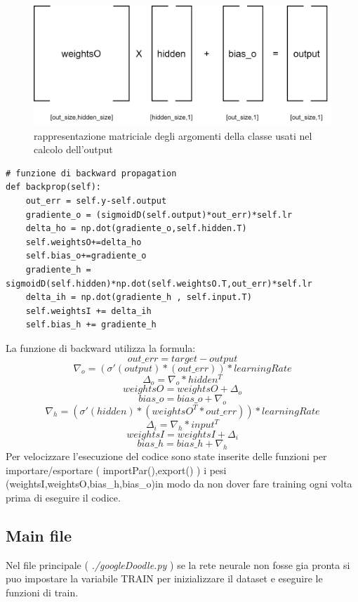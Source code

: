 \documentclass[12pt]{article}
\begin{document}
\begin{figure}[h!]
	\centering
	\includegraphics[width=10 cm]{resources/output.png}
	\caption{rappresentazione matriciale degli argomenti della classe usati nel calcolo dell'output}
	\label{fig:output}
\end{figure}
\newpage
\begin{lstlisting}[language=myPython]
# funzione di backward propagation
def backprop(self):
	out_err = self.y-self.output
	gradiente_o = (sigmoidD(self.output)*out_err)*self.lr
	delta_ho = np.dot(gradiente_o,self.hidden.T)
	self.weightsO+=delta_ho
	self.bias_o+=gradiente_o
	gradiente_h = sigmoidD(self.hidden)*np.dot(self.weightsO.T,out_err)*self.lr
	delta_ih = np.dot(gradiente_h , self.input.T)
	self.weightsI += delta_ih
	self.bias_h += gradiente_h
\end{lstlisting}
La funzione di backward utilizza la formula:
\[out\_err=target-output\]
\[ \nabla_o=({\sigma'(output)}*(out\_err))*learningRate \]
\[ \Delta_o=\nabla_o * hidden^T \]
\[weightsO= weightsO+\Delta_o\]
\[bias\_o=bias\_o+\nabla_o\]
\[ \nabla_h=({\sigma'(hidden)}*(weightsO^T*out\_err))*learningRate \]
\[\Delta_i=\nabla_h*input^T\]
\[weightsI=weightsI+\Delta_i\]
\[bias\_h=bias\_h+\nabla_h\]
Per velocizzare l'esecuzione del codice sono state inserite delle funzioni per importare/esportare ( importPar(),export() ) i pesi (weightsI,weightsO,bias\_h,bias\_o)in modo da non dover fare training ogni volta prima di eseguire il codice.
\newpage
\subsection{Main file}
Nel file principale ( \textit{./googleDoodle.py} ) se la rete neurale non fosse gia pronta si puo impostare la variabile TRAIN per inizializzare il dataset e eseguire le funzioni di train.
\end{document}

